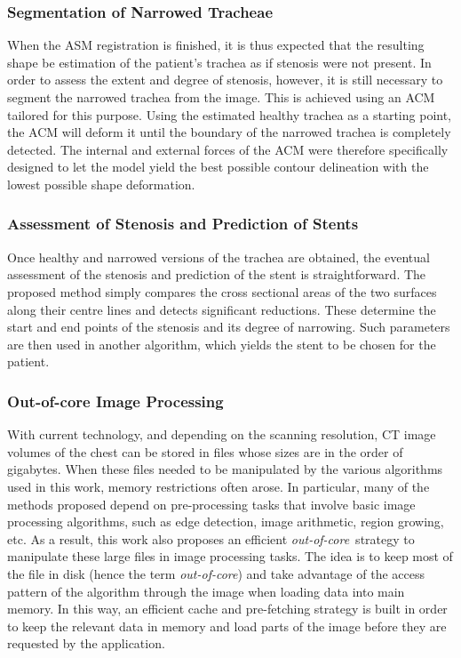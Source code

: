\documentclass[a4paper]{article}
\newcommand{\outcore}{\textit{out-of-core}}
\begin{document}
\subsubsection{Segmentation of Narrowed Tracheae}

When the ASM registration is finished, it is thus expected that the resulting shape be estimation of the patient's trachea as if stenosis were not present. In order to assess the extent and degree of stenosis, however, it is still necessary to segment the narrowed trachea from the image. This is achieved using an ACM tailored for this purpose. Using the estimated healthy trachea as a starting point, the ACM will deform it until the boundary of the narrowed trachea is completely detected. The internal and external forces of the ACM were therefore specifically designed to let the model yield the best possible contour delineation with the lowest possible shape deformation.

\subsubsection{Assessment of Stenosis and Prediction of Stents}

Once healthy and narrowed versions of the trachea are obtained, the eventual assessment of the stenosis and prediction of the stent is straightforward. The proposed method simply compares the cross sectional areas of the two surfaces along their centre lines and detects significant reductions. These determine the start and end points of the stenosis and its degree of narrowing. Such parameters are then used in another algorithm, which yields the stent to be chosen for the patient.

\subsubsection{Out-of-core Image Processing}

With current technology, and depending on the scanning resolution, CT image volumes of the chest can be stored in files whose sizes are in the order of gigabytes. When these files needed to be manipulated by the various algorithms used in this work, memory restrictions often arose. In particular, many of the methods proposed depend on pre-processing tasks that involve basic image processing algorithms, such as edge detection, image arithmetic, region growing, etc. As a result, this work also proposes an efficient \outcore\ strategy to manipulate these large files in image processing tasks. The idea is to keep most of the file in disk (hence the term \outcore) and take advantage of the access pattern of the algorithm through the image when loading data into main memory. In this way, an efficient cache and pre-fetching strategy is built in order to keep the relevant data in memory and load parts of the image before they are requested by the application. 
\end{document}
